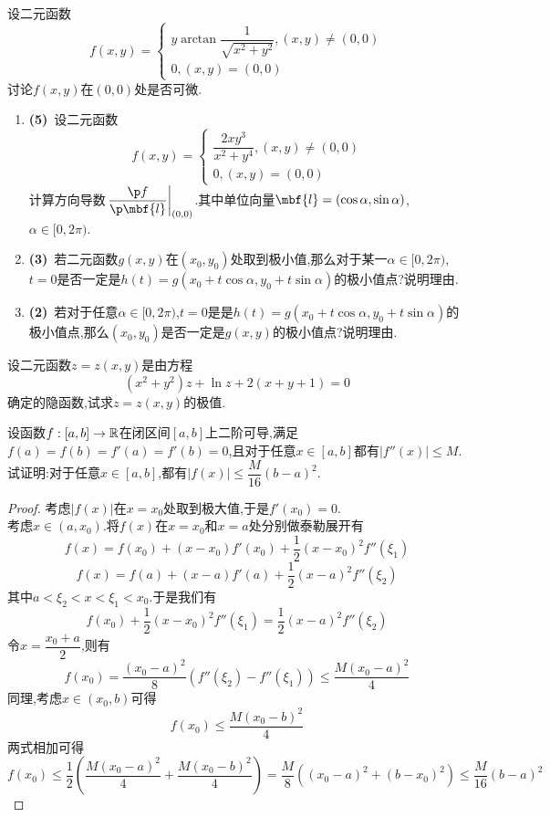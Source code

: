 \documentclass{ctexart}
\begin{document}
\begin{problem}[6.(10\songti{分})]
    设二元函数\[f(x,y)=\left\{\begin{array}{l}
        y\arctan\dfrac{1}{\sqrt{x^2+y^2}},(x,y)\neq(0,0)\\
        0,(x,y)=(0,0)
    \end{array}\right.\]讨论$f(x,y)$在$(0,0)$处是否可微.
\end{problem}
\begin{problem}[7.(10\songti{分})]
    \begin{enumerate}[label=\tbf{(\arabic*)}]
        \item \textbf{(5)}\ 设二元函数\[f(x,y)=\left\{\begin{array}{l}
                \dfrac{2xy^3}{x^2+y^4},(x,y)\neq(0,0)\\
                0,(x,y)=(0,0)
            \end{array}\right.\]计算方向导数$\left.\dfrac{\p f}{\p\mbf{l}}\right|_{(0,0)}$.其中单位向量$\mbf{l}=(\cos\alpha,\sin\alpha)$,$\alpha\in[0,2\pi)$.
        \item \textbf{(3)}\ 若二元函数$g(x,y)$在$(x_0,y_0)$处取到极小值,那么对于某一$\alpha\in[0,2\pi)$,$t=0$是否一定是$h(t)=g(x_0+t\cos\alpha,y_0+t\sin\alpha)$的极小值点?说明理由.
        \item \textbf{(2)}\ 若对于任意$\alpha\in[0,2\pi)$,$t=0$是是$h(t)=g(x_0+t\cos\alpha,y_0+t\sin\alpha)$的极小值点,那么$(x_0,y_0)$是否一定是$g(x,y)$的极小值点?说明理由.
    \end{enumerate}
\end{problem}
\begin{problem}[8.(15\songti{分})]
    设二元函数$z=z(x,y)$是由方程
    \[(x^2+y^2)z+\ln z+2(x+y+1)=0\]确定的隐函数,试求$z=z(x,y)$的极值.
\end{problem}
\begin{problem}[9.(10\songti{分})]
    设函数$f:[a,b]\to\mathbb{R}$在闭区间$[a,b]$上二阶可导,满足$f(a)=f(b)=f'(a)=f'(b)=0$,且对于任意$x\in[a,b]$都有$|f''(x)|\leqslant M$.试证明:对于任意$x\in[a,b]$,都有$|f(x)|\leqslant\dfrac{M}{16}(b-a)^2$.
\end{problem}
\begin{proof}
    考虑$|f(x)|$在$x=x_0$处取到极大值,于是$f'(x_0)=0$.\\
    考虑$x\in(a,x_0)$.将$f(x)$在$x=x_0$和$x=a$处分别做泰勒展开有
    \[f(x)=f(x_0)+(x-x_0)f'(x_0)+\dfrac{1}{2}(x-x_0)^2f''(\xi_1)\]
    \[f(x)=f(a)+(x-a)f'(a)+\dfrac{1}{2}(x-a)^2f''(\xi_2)\]
    其中$a<\xi_2<x<\xi_1<x_0$.于是我们有
    \[f(x_0)+\dfrac{1}{2}(x-x_0)^2f''(\xi_1)=\dfrac{1}{2}(x-a)^2f''(\xi_2)\]
    令$x=\dfrac{x_0+a}{2}$,则有
    \[f(x_0)=\dfrac{(x_0-a)^2}{8}\left(f''(\xi_2)-f''(\xi_1)\right)\leqslant\dfrac{M(x_0-a)^2}{4}\]
    同理,考虑$x\in(x_0,b)$可得
    \[f(x_0)\leqslant\dfrac{M(x_0-b)^2}{4}\]
    两式相加可得
    \[f(x_0)\leqslant\dfrac{1}{2}\left(\dfrac{M(x_0-a)^2}{4}+\dfrac{M(x_0-b)^2}{4}\right)=\dfrac{M}{8}\left((x_0-a)^2+(b-x_0)^2\right)\leqslant\dfrac{M}{16}(b-a)^2\]
\end{proof}
\end{document}
